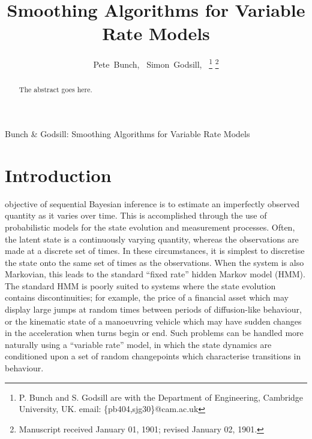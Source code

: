 \documentclass[journal]{IEEEtran}
\begin{document}
\title{Smoothing Algorithms for Variable Rate Models}

\author{Pete~Bunch,~\IEEEmembership{}
        Simon~Godsill,~%
\thanks{P. Bunch and S. Godsill are with the Department
of Engineering, Cambridge University, UK. email: \{pb404,sjg30\}@cam.ac.uk}%
\thanks{Manuscript received January 01, 1901; revised January 02, 1901.}}

%
{Bunch \& Godsill: Smoothing Algorithms for Variable Rate Models}

\maketitle

\begin{abstract}
The abstract goes here.
\end{abstract}

\begin{IEEEkeywords}

\end{IEEEkeywords}



\section{Introduction}

 objective of sequential Bayesian inference is to estimate an imperfectly observed quantity as it varies over time. This is accomplished through the use of probabilistic models for the state evolution and measurement processes. Often, the latent state is a continuously varying quantity, whereas the observations are made at a discrete set of times. In these circumstances, it is simplest to discretise the state onto the same set of times as the observations. When the system is also Markovian, this leads to the standard ``fixed rate'' hidden Markov model (HMM). The standard HMM is poorly suited to systems where the state evolution contains discontinuities; for example, the price of a financial asset which may display large jumps at random times between periods of diffusion-like behaviour, or the kinematic state of a manoeuvring vehicle which may have sudden changes in the acceleration when turns begin or end. Such problems can be handled more naturally using a ``variable rate'' model, in which the state dynamics are conditioned upon a set of random changepoints which characterise transitions in behaviour.
\end{document}
